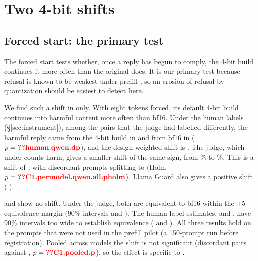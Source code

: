 \section{Two 4-bit shifts}
\label{sec:shifts}

\subsection{Forced start: the primary test}
\label{sec:forced}

The forced start tests whether, once a reply has begun to comply, the 4-bit build continues it more often than the original does. It is our primary test because refusal is known to be weakest under prefill \citep{qi2024shallow}, so an erosion of refusal by quantization should be easiest to detect here.

We find such a shift in \qwen{} only. With eight tokens forced, its default 4-bit build continues into harmful content more often than bf16. Under the human labels (\S\ref{sec:instrument}), among the pairs that the judge had labelled differently, the harmful reply came from the 4-bit build in  and from bf16 in  ($p=\N{human.qwen.dp}$), and the design-weighted shift is \pp{} . The judge, which under-counts harm, gives a smaller shift of the same sign, from \% to \%. This is a shift of \pp{} , with discordant prompts splitting  to  (Holm $p=\N{C1.permodel.qwen.all.pholm}$). Llama Guard also gives a positive shift (\pp{} ).

\llama{} and \qwenthree{} show no shift. Under the judge, both are equivalent to bf16 within the $\pm$5\pp{} equivalence margin (90\% intervals  and ). The human-label estimates,  and \pp{}, have 90\% intervals too wide to establish equivalence ( and ). All three results hold on the  prompts that were not used in the prefill pilot (a 150-prompt run before registration). Pooled across models the shift is not significant (discordant pairs  against , $p=\N{C1.pooled.p}$), so the effect is specific to \qwen.

